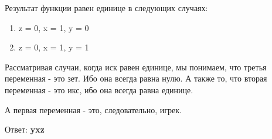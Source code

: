 \documentclass[11pt]{article} %
\begin{document}
\vspace{2mm}

Результат функции равен единице в следующих случаях:

\begin{enumerate}
	\item z = 0, x = 1, y = 0
	\item z = 0, x = 1, y = 1
\end{enumerate}

Рассматривая случаи, когда иск равен единице, мы понимаем, что третья переменная - это зет. Ибо она всегда равна нулю. А также то, что вторая переменная - это икс, ибо она всегда равна единице.

А первая переменная - это, следовательно, игрек.

Ответ: \textbf{yxz}
\end{document}
